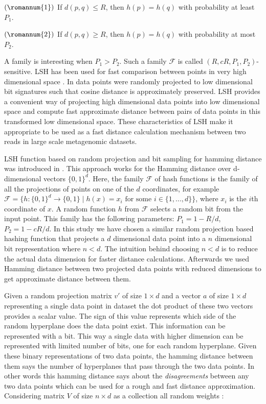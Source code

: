 \documentclass[10pt, conference, compsocconf]{IEEEtran}
\begin{document}
$(\romannum{1})$ If ${\displaystyle d(p,q)\leq R}$, then ${\displaystyle h(p)=h(q)}$ with probability at least ${\displaystyle P_{1}}$.
 
$(\romannum{2})$ If ${\displaystyle d(p,q)\geq R}$, then ${\displaystyle h(p)=h(q)}$ with probability at most ${\displaystyle P_{2}}$.

A family is interesting when ${\displaystyle P_{1}>P_{2}}$. Such a family ${\displaystyle {\mathcal {F}}}$ is called ${\displaystyle (R,cR,P_{1},P_{2})}$-sensitive. LSH has been used for fast comparison between points in very high dimensional space \cite{MARLshRef3}. In \cite{MARLshRef4} data points were randomly projected to low dimensional bit signatures such that cosine distance is approximately preserved. LSH provides a convenient way of projecting high dimensional data points into low dimensional space and compute fast approximate distance between pairs of data points in this transformed low dimensional space. These characteristics of LSH make it appropriate to be used as a fast distance calculation mechanism between two reads in large scale metagenomic datasets.

LSH function based on random projection and bit sampling for hamming distance was introduced in \cite{MARLshRef3}. This approach works for the Hamming distance over d-dimensional vectors $\{0,1\}^{d}$. Here, the family $\mathcal{F}$ of hash functions is the family of all the projections of points on one of the $d$ coordinates, for example $\mathcal {F}=\{h:\{0,1\}^{d}\to \{0,1\}\mid h(x)=x_{i}{\text{ for some }}i\in \{1,...,d\}\}$, where ${\displaystyle x_{i}}$ is the ${\displaystyle i}$th coordinate of ${\displaystyle x}$. A random function ${\displaystyle h}$ from ${\displaystyle {\mathcal {F}}}$ selects a random bit from the input point. This family has the following parameters: ${\displaystyle P_{1}=1-R/d}$, ${\displaystyle P_{2}=1-cR/d}$. In this study we have chosen a similar random projection based hashing function that projects a $d$ dimensional data point into a $n$ dimensional bit representation where $n<d$. The intuition behind choosing $n<d$ is to reduce the actual data dimension for faster distance calculations. Afterwards we used Hamming distance between two projected data points with reduced dimensions to get approximate distance between them.

Given a random projection matrix $v'$ of size $1 \times d$ and a vector $a$ of size $1 \times d$ representing a single data point in dataset the dot product of these two vectors provides a scalar value. The sign of this value represents which side of the random hyperplane does the data point exist. This information can be represented with a bit. This way a single data with higher dimension can be represented with limited number of bits, one for each random hyperplane. Given these binary representations of two data points, the hamming distance between them says the number of hyperplanes that pass through the two data points. In other words this hamming distance says about the \textit{disagreements} between any two data points which can be used for a rough and fast distance approximation. Considering matrix $V$ of size $n \times d$ as a collection all random weights :    
\end{document}
